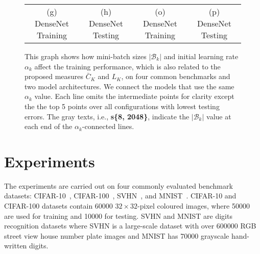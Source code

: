 \documentclass[10pt,journal,compsoc]{IEEEtran}
\begin{document}
\begin{figure*}
\begin{center}
{\begin{tabular}{cc|cc}
(g) DenseNet Training & (h) DenseNet Testing & (o) DenseNet Training & (p) DenseNet Testing \\
\end{tabular}}
\end{center}
\caption{This graph shows how mini-batch sizes $|\mathcal{B}_k|$ and initial learning rate $\alpha_k$ affect the training performance, which is also related to the proposed measures $\bar{C}_K$ and $L_K$, on four common benchmarks and two model architectures.
We connect the models that use the same $\alpha_k$ value.
Each line omits the intermediate points for clarity except the the top 5 points over all configurations with lowest testing errors.
The gray texts, i.e., {\bf s\{8, 2048\}}, indicate the $|\mathcal{B}_k|$ value at each end of the  $\alpha_k$-connected lines. %
}
\label{fig:batchsize_lr}
\end{figure*}


\section{Experiments}

The experiments are carried out on four commonly evaluated benchmark datasets: CIFAR-10~\cite{krizhevsky2009learning}, CIFAR-100~\cite{krizhevsky2009learning}, SVHN~\cite{netzer2011reading}, and MNIST~\cite{lecun1998gradient}.  
CIFAR-10 and CIFAR-100 datasets contain 60000 $32 \times 32$-pixel coloured images, where 50000 are used for training and 10000 for testing.
SVHN and MNIST are digits recognition datasets where SVHN is a large-scale dataset with over 600000 RGB street view house number plate images and MNIST has 70000 grayscale hand-written digits.
\end{document}
